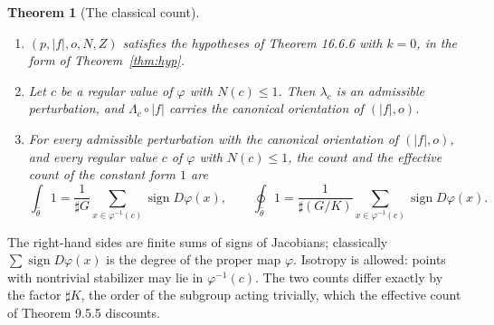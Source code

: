 \documentclass[11pt,a4paper]{article}
\theoremstyle{plain}
\newtheorem{theorem}{Theorem}[section]
\theoremstyle{definition}
\theoremstyle{remark}
\newcommand{\abs}[1]{\lvert #1\rvert}
\newcommand{\card}{\sharp}
\begin{document}
\begin{theorem}[The classical count]\label{thm:classical}
\begin{enumerate}[label=(\alph*)]
\item $(p,\abs f,o,N,Z)$ satisfies the hypotheses of Theorem 16.6.6 with $k=0$, in the form of
  Theorem~\ref{thm:hyp}.
\item Let $c$ be a regular value of $\varphi$ with $N(c)\le1$. Then $\lambda_c$ is an admissible
  perturbation, and $\Lambda_c\circ\abs f$ carries the canonical orientation of $(\abs f,o)$.
\item For every admissible perturbation with the canonical orientation of $(\abs f,o)$, and every regular
  value $c$ of $\varphi$ with $N(c)\le1$, the count and the effective count of the constant form $1$ are
  \[
    \int_{\hat\theta}1=\frac1{\card G}\sum_{x\in\varphi^{-1}(c)}\operatorname{sign}D\varphi(x),
    \qquad
    \oint_{\hat\theta}1=\frac1{\card(G/K)}\sum_{x\in\varphi^{-1}(c)}\operatorname{sign}D\varphi(x).
  \]
\end{enumerate}
\end{theorem}

The right-hand sides are finite sums of signs of Jacobians; classically $\sum\operatorname{sign}D\varphi(x)$
is the degree of the proper map $\varphi$. Isotropy is allowed: points with nontrivial stabilizer may lie
in $\varphi^{-1}(c)$. The two counts differ exactly by the factor $\card K$, the order of the subgroup
acting trivially, which the effective count of Theorem 9.5.5 discounts.
\end{document}
